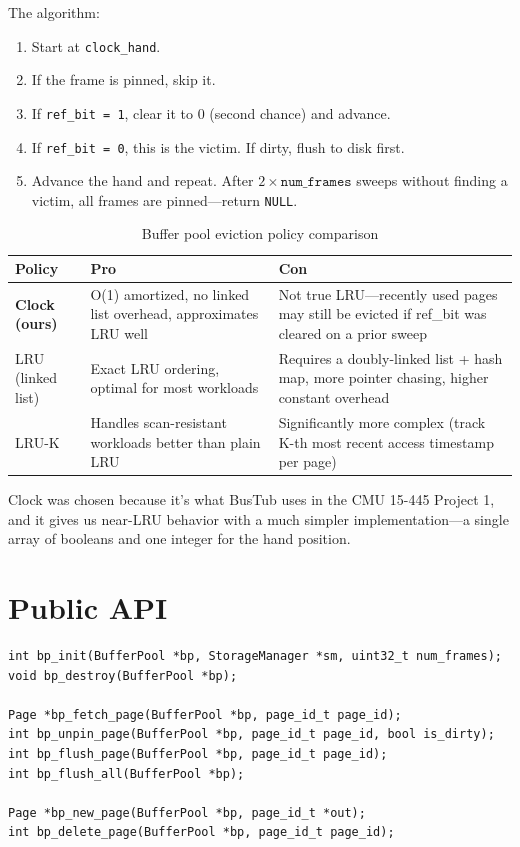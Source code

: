 \documentclass[12pt, a4paper]{report}
\begin{document}
The algorithm:
\begin{enumerate}[itemsep=2pt]
    \item Start at \texttt{clock\_hand}.
    \item If the frame is pinned, skip it.
    \item If \texttt{ref\_bit = 1}, clear it to 0 (second chance) and advance.
    \item If \texttt{ref\_bit = 0}, this is the victim. If dirty, flush to disk
          first.
    \item Advance the hand and repeat. After $2 \times \texttt{num\_frames}$
          sweeps without finding a victim, all frames are pinned---return
          \texttt{NULL}.
\end{enumerate}

\begin{table}[h]
\centering
\begin{tabularx}{\textwidth}{lXX}
\toprule
\textbf{Policy} & \textbf{Pro} & \textbf{Con} \\
\midrule
\textbf{Clock (ours)} &
    O(1) amortized, no linked list overhead, approximates LRU well &
    Not true LRU---recently used pages may still be evicted if
    ref\_bit was cleared on a prior sweep \\
\addlinespace
LRU (linked list) &
    Exact LRU ordering, optimal for most workloads &
    Requires a doubly-linked list + hash map, more pointer chasing,
    higher constant overhead \\
\addlinespace
LRU-K &
    Handles scan-resistant workloads better than plain LRU &
    Significantly more complex (track K-th most recent access
    timestamp per page) \\
\bottomrule
\end{tabularx}
\caption{Buffer pool eviction policy comparison}
\end{table}

Clock was chosen because it's what BusTub uses in the CMU 15-445 Project 1,
and it gives us near-LRU behavior with a much simpler implementation---a
single array of booleans and one integer for the hand position.


\section{Public API}

\begin{lstlisting}
int bp_init(BufferPool *bp, StorageManager *sm, uint32_t num_frames);
void bp_destroy(BufferPool *bp);

Page *bp_fetch_page(BufferPool *bp, page_id_t page_id);
int bp_unpin_page(BufferPool *bp, page_id_t page_id, bool is_dirty);
int bp_flush_page(BufferPool *bp, page_id_t page_id);
int bp_flush_all(BufferPool *bp);

Page *bp_new_page(BufferPool *bp, page_id_t *out);
int bp_delete_page(BufferPool *bp, page_id_t page_id);
\end{lstlisting}
\end{document}
